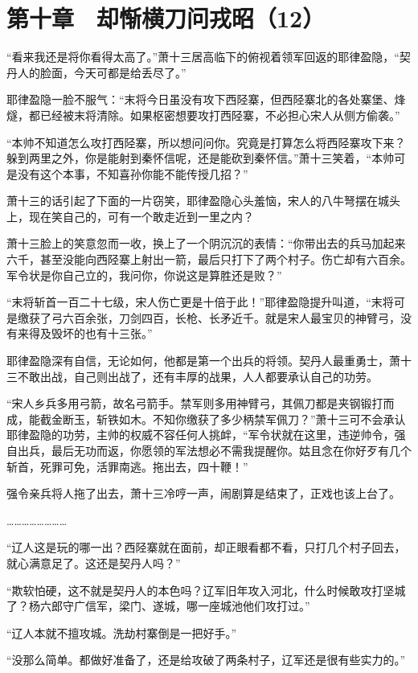\section{第十章　却惭横刀问戎昭（12）}

“看来我还是将你看得太高了。”萧十三居高临下的俯视着领军回返的耶律盈隐，“契丹人的脸面，今天可都是给丢尽了。”

耶律盈隐一脸不服气：“末将今日虽没有攻下西陉寨，但西陉寨北的各处寨堡、烽燧，都已经被末将清除。如果枢密想要攻打西陉寨，不必担心宋人从侧方偷袭。”

“本帅不知道怎么攻打西陉寨，所以想问问你。究竟是打算怎么将西陉寨攻下来？躲到两里之外，你是能射到秦怀信呢，还是能砍到秦怀信。”萧十三笑着，“本帅可是没有这个本事，不知喜孙你能不能传授几招？”

萧十三的话引起了下面的一片窃笑，耶律盈隐心头羞恼，宋人的八牛弩摆在城头上，现在笑自己的，可有一个敢走近到一里之内？

萧十三脸上的笑意忽而一收，换上了一个阴沉沉的表情：“你带出去的兵马加起来六千，甚至没能向西陉寨上射出一箭，最后只打下了两个村子。伤亡却有六百余。军令状是你自己立的，我问你，你说这是算胜还是败？”

“末将斩首一百二十七级，宋人伤亡更是十倍于此！”耶律盈隐提升叫道，“末将可是缴获了弓六百余张，刀剑四百，长枪、长矛近千。就是宋人最宝贝的神臂弓，没有来得及毁坏的也有十三张。”

耶律盈隐深有自信，无论如何，他都是第一个出兵的将领。契丹人最重勇士，萧十三不敢出战，自己则出战了，还有丰厚的战果，人人都要承认自己的功劳。

“宋人乡兵多用弓箭，故名弓箭手。禁军则多用神臂弓，其佩刀都是夹钢锻打而成，能截金断玉，斩铁如木。不知你缴获了多少柄禁军佩刀？”萧十三可不会承认耶律盈隐的功劳，主帅的权威不容任何人挑衅，“军令状就在这里，违逆帅令，强自出兵，最后无功而返，你愿领的军法想必不需我提醒你。姑且念在你好歹有几个斩首，死罪可免，活罪南逃。拖出去，四十鞭！”

强令亲兵将人拖了出去，萧十三冷哼一声，闹剧算是结束了，正戏也该上台了。

……………………

“辽人这是玩的哪一出？西陉寨就在面前，却正眼看都不看，只打几个村子回去，就心满意足了。这还是契丹人吗？”

“欺软怕硬，这不就是契丹人的本色吗？辽军旧年攻入河北，什么时候敢攻打坚城了？杨六郎守广信军，梁门、遂城，哪一座城池他们攻打过。”

“辽人本就不擅攻城。洗劫村寨倒是一把好手。”

“没那么简单。都做好准备了，还是给攻破了两条村子，辽军还是很有些实力的。”

